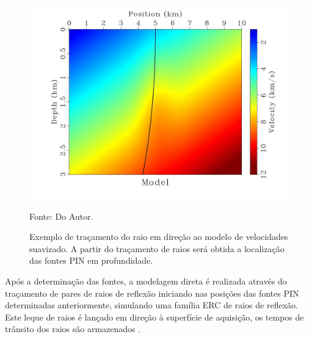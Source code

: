\begin{figure}[H]
\caption{Exemplo de traçamento do raio em direção ao modelo de velocidades suavizado.
A partir do traçamento de raios será obtida a localização das fontes PIN em profundidade.}
\begin{center}
\includegraphics[scale=0.3]{images/raiomodelo.jpg}
\vspace{-0.3cm}
\end{center}
\begin{center}
 Fonte: Do Autor.
\end{center}
\label{fig:2.2}
\end{figure}

Após a determinação das fontes, a modelagem direta é realizada através do traçamento de pares de raios de reflexão
iniciando nas posições das fontes PIN determinadas anteriormente, simulando uma família ERC de raios de reflexão.
Este leque de raios é lançado em direção à superfície de aquisição,
os tempos de trânsito dos raios são armazenados \cite{stereo}.

